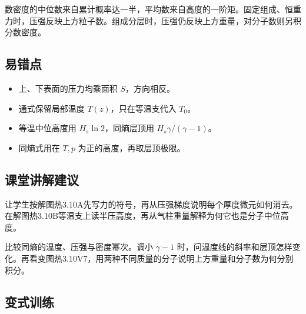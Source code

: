 \documentclass[UTF8,fontset=fandol,a4paper,11pt]{ctexart}
\begin{document}
数密度的中位数来自累计概率达一半，平均数来自高度的一阶矩。固定组成、恒重力时，压强反映上方粒子数。组成分层时，压强仍反映上方重量，对分子数则另积分数密度。



\subsection*{易错点}

\begin{itemize}
\item 上、下表面的压力均乘面积 $S$，方向相反。
\item 通式保留局部温度 $T(z)$，只在等温支代入 $T_0$。
\item 等温中位高度用 $H_s\ln 2$，同熵层顶用 $H_s\gamma/(\gamma-1)$。
\item 同熵式用在 $T,p$ 为正的高度，再取层顶极限。
\end{itemize}



\subsection*{课堂讲解建议}

让学生按解图热3.10A先写力的符号，再从压强梯度说明每个厚度微元如何消去。在解图热3.10B等温支上读半压高度，再从气柱重量解释为何它也是分子中位高度。

比较同熵的温度、压强与密度幂次。调小 $\gamma-1$ 时，问温度线的斜率和层顶怎样变化。再看变图热3.10V7，用两种不同质量的分子说明上方重量和分子数为何分别积分。



\subsection*{变式训练}
\end{document}
